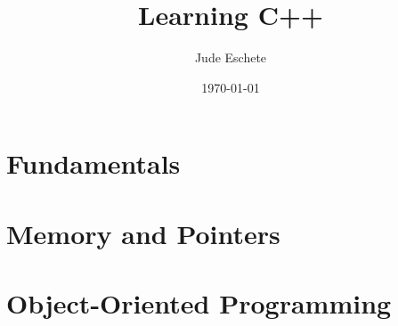 \documentclass[12pt,letterpaper]{article}
\title{Learning C++}
\author{Jude Eschete}
\date{\today}
\theoremstyle{definition}
\theoremstyle{remark}
\begin{document}
	
	\maketitle
	\newpage
	\tableofcontents
	\newpage
	
	\part{Fundamentals}
	
	
	\newpage

	
	\newpage

	
	\newpage

	
	\newpage

	
	\newpage

	
	\newpage

	
	\newpage

	\part{Memory and Pointers}

	
	\newpage

	\part{Object-Oriented Programming}

	
	\newpage

	
	\newpage

	
	\newpage
\end{document}
